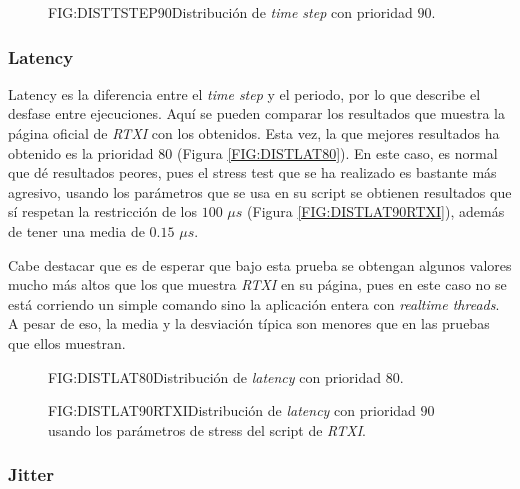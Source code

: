 \begin{figure}[Distribución de time step con prioridad 90]{FIG:DISTTSTEP90}{Distribución de \textit{time step} con prioridad $90$.}
\end{figure}


\subsubsection{Latency\label{SSS:LATENCY}}


Latency es la diferencia entre el \textit{time step} y el periodo, por lo que describe el desfase entre ejecuciones. Aquí se pueden comparar los resultados que muestra la página oficial de \textit{RTXI} con los obtenidos. Esta vez, la que mejores resultados ha obtenido es la prioridad $80$ (Figura \ref{FIG:DISTLAT80}). En este caso, es normal que dé resultados peores, pues el stress test que se ha realizado es bastante más agresivo, usando los parámetros que se usa en su script se obtienen resultados que sí respetan la restricción de los $100$ $\mu s$ (Figura \ref{FIG:DISTLAT90RTXI}), además de tener una media de $0.15$ $\mu s$.

Cabe destacar que es de esperar que bajo esta prueba se obtengan algunos valores mucho más altos que los que muestra \textit{RTXI} en su página, pues en este caso no se está corriendo un simple comando sino la aplicación entera con \textit{realtime threads}. A pesar de eso, la media y la desviación típica son menores que en las pruebas que ellos muestran.

\begin{figure}[Distribución de latency con prioridad 80]{FIG:DISTLAT80}{Distribución de \textit{latency} con prioridad $80$.}
\end{figure}

\begin{figure}[Distribución de latency con prioridad 90]{FIG:DISTLAT90RTXI}{Distribución de \textit{latency} con prioridad $90$ usando los parámetros de stress del script de \textit{RTXI}.}
\end{figure}



\subsubsection{Jitter\label{SSS:JITTER}}


